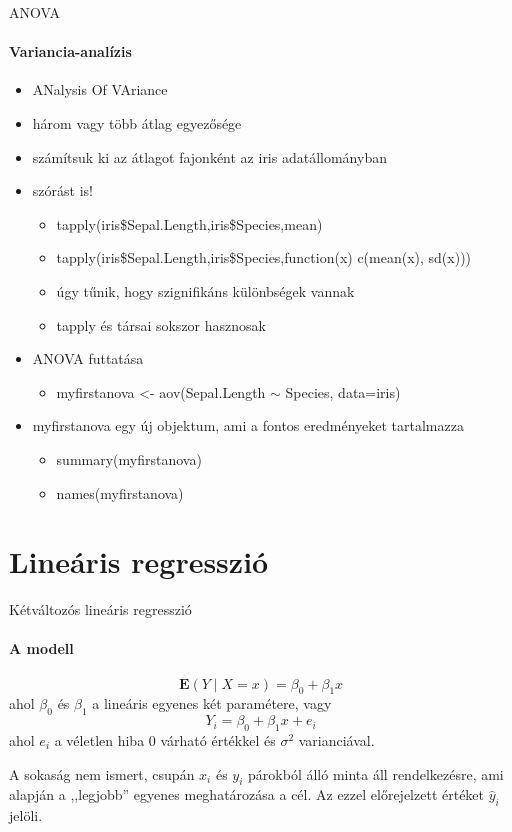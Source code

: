 \documentclass[10pt]{beamer}
\begin{document}
\begin{frame}{ANOVA}
\framesubtitle{Variancia-analízis}
\begin{itemize}
\item ANalysis Of VAriance
\item három vagy több átlag egyezősége
\item számítsuk ki az átlagot fajonként az iris adatállományban
\item szórást is!
\begin{itemize}
\item tapply(iris\$Sepal.Length,iris\$Species,mean)
\item tapply(iris\$Sepal.Length,iris\$Species,function(x) c(mean(x), sd(x)))
\item úgy tűnik, hogy szignifikáns különbségek vannak
\item tapply és társai sokszor hasznosak
\end{itemize}
\item ANOVA futtatása
\begin{itemize}
\item myfirstanova <- aov(Sepal.Length $\sim$ Species, data=iris)
\end{itemize}
\item myfirstanova egy új objektum, ami a fontos eredményeket tartalmazza
\begin{itemize}
\item summary(myfirstanova)
\item names(myfirstanova)
\end{itemize}
\end{itemize}
\end{frame}

\section{Lineáris regresszió}

\begin{frame}{Kétváltozós lineáris regresszió}
\framesubtitle{A modell}

\[
\mathbf{E}\left(Y \mid X =x\right) = \beta_0 + \beta_1 x
\]
ahol $\beta_0$ és $\beta_1$ a lineáris egyenes két paramétere, vagy
\[
Y_i = \beta_0 + \beta_1 x + e_i
\]
ahol $e_i$ a véletlen hiba 0 várható értékkel és $\sigma^2$ varianciával.

A sokaság nem ismert, csupán $x_i$ és $y_i$ párokból álló minta áll rendelkezésre, ami alapján a ,,legjobb'' egyenes meghatározása a cél. Az ezzel előrejelzett értéket $\hat{y}_i$ jelöli.
\end{frame}
\end{document}
